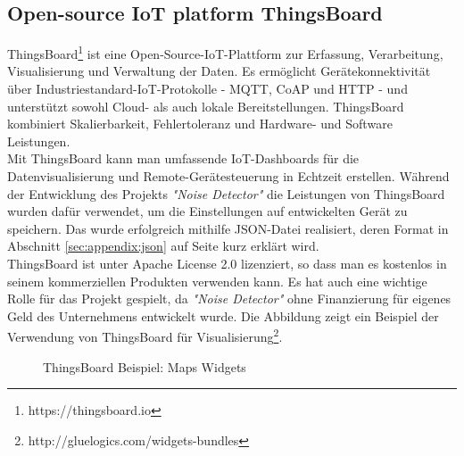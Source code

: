 \subsection{Open-source IoT platform ThingsBoard}
\label{sec:appendix:thingcloud}
ThingsBoard\footnote{https://thingsboard.io} ist eine Open-Source-IoT-Plattform zur Erfassung, Verarbeitung, Visualisierung und Verwaltung der Daten. Es ermöglicht Gerätekonnektivität über Industriestandard-IoT-Protokolle - MQTT, CoAP und HTTP - und unterstützt sowohl Cloud- als auch lokale Bereitstellungen. ThingsBoard kombiniert Skalierbarkeit, Fehlertoleranz und Hardware- und Software Leistungen. \\
Mit ThingsBoard kann man umfassende IoT-Dashboards für die Datenvisualisierung und Remote-Gerätesteuerung in Echtzeit erstellen. Während der Entwicklung des Projekts \textit{"Noise Detector"} die Leistungen von ThingsBoard wurden dafür verwendet, um die Einstellungen auf entwickelten Gerät zu speichern. Das wurde erfolgreich mithilfe JSON-Datei realisiert, deren Format in Abschnitt \ref{sec:appendix:json} auf Seite \pageref{sec:appendix:json} kurz erklärt wird. \\
ThingsBoard ist unter Apache License 2.0 lizenziert, so dass man es kostenlos in seinem kommerziellen Produkten verwenden kann. Es hat auch eine wichtige Rolle für das Projekt gespielt, da \textit{"Noise Detector"} ohne Finanzierung für eigenes Geld des Unternehmens entwickelt wurde. Die Abbildung zeigt ein Beispiel der Verwendung von ThingsBoard für Visualisierung\footnote{http://gluelogics.com/widgets-bundles}. 
\begin{figure}[!htb]
  \centering
   \caption[ThingsBoard Beispiel]{ThingsBoard Beispiel: Maps Widgets}
   \label{fig:thingboard}
\end{figure}

